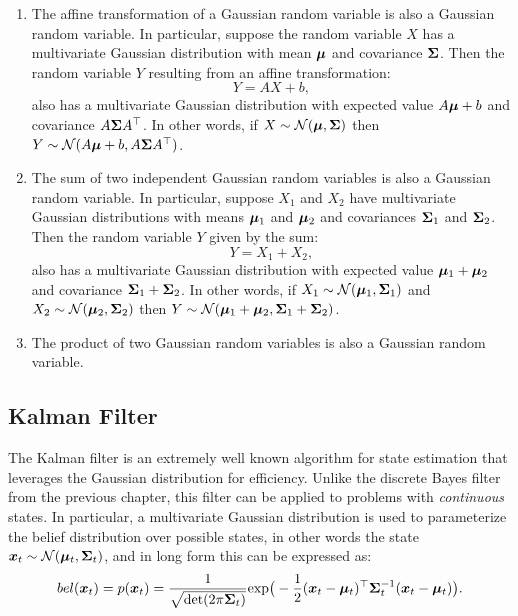 \begin{enumerate}
    \item The affine transformation of a Gaussian random variable is also a Gaussian random variable. In particular, suppose the random variable $X$ has a multivariate Gaussian distribution with mean $\bm{\mu}$ and covariance $\bm{\Sigma}$. Then the random variable $Y$ resulting from an affine transformation:
    \begin{equation*}
        Y = AX + b,
    \end{equation*}
    also has a multivariate Gaussian distribution with expected value $A\bm{\mu} + b$ and covariance $A\bm{\Sigma} A^\top $. In other words, if $X \sim \mathcal{N}(\bm{\mu}, \bm{\Sigma})$ then $Y \sim \mathcal{N}(A\bm{\mu}+b, A\bm{\Sigma} A^\top )$.
    \item The sum of two independent Gaussian random variables is also a Gaussian random variable. In particular, suppose $X_1$ and $X_2$ have multivariate Gaussian distributions with means $\bm{\mu}_1$ and $\bm{\mu}_2$ and covariances $\bm{\Sigma}_1$ and $\bm{\Sigma}_2$. Then the random variable $Y$ given by the sum:
    \begin{equation*}
        Y = X_1 + X_2,
    \end{equation*}
    also has a multivariate Gaussian distribution with expected value $\bm{\mu}_1 + \bm{\mu}_2$ and covariance $\bm{\Sigma}_1 + \bm{\Sigma}_2$. In other words, if $X_1 \sim \mathcal{N}(\bm{\mu}_1, \bm{\Sigma}_1)$ and $X_2 \sim \mathcal{N}(\bm{\mu}_2, \bm{\Sigma}_2)$ then $Y \sim \mathcal{N}(\bm{\mu}_1 + \bm{\mu}_2, \bm{\Sigma}_1 + \bm{\Sigma}_2)$.
    \item The product of two Gaussian random variables is also a Gaussian random variable.
\end{enumerate}

\subsection{Kalman Filter}
The Kalman filter is an extremely well known algorithm for state estimation that leverages the Gaussian distribution for efficiency. Unlike the discrete Bayes filter from the previous chapter, this filter can be applied to problems with \textit{continuous} states.
In particular, a multivariate Gaussian distribution is used to parameterize the belief distribution over possible states, in other words the state $\bm{x}_t \sim \mathcal{N}(\bm{\mu}_t, \bm{\Sigma}_t)$, and in long form this can be expressed as:
\begin{equation*}
bel(\bm{x}_t) = p(\bm{x}_t) = \frac{1}{\sqrt{\text{det}(2\pi \bm{\Sigma}_t)}} \text{exp}\big( -\frac{1}{2}(\bm{x}_t-\bm{\mu}_t)^\top  \bm{\Sigma}_t^{-1} (\bm{x}_t-\bm{\mu}_t) \big).
\end{equation*}

